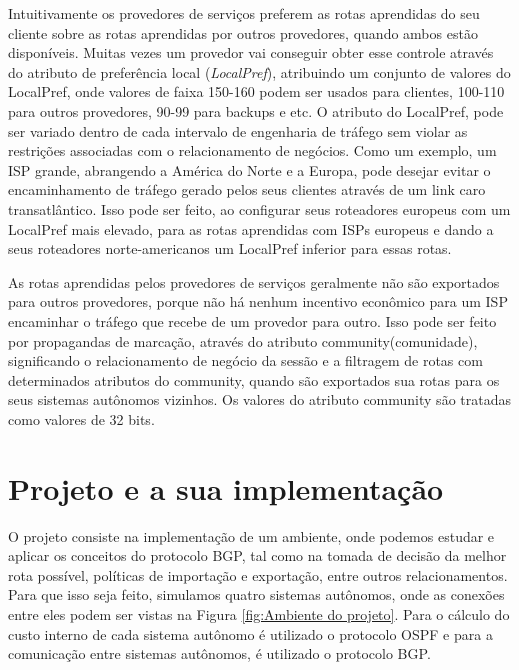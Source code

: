 \documentclass[12pt,a4paper]{report}
\begin{document}
Intuitivamente os provedores de servi\c{c}os preferem as rotas aprendidas do seu cliente sobre as rotas aprendidas por outros provedores, quando ambos est\~ao dispon\'iveis. Muitas vezes um provedor vai conseguir obter esse controle atrav\'es do atributo de prefer\^encia local (\textit{LocalPref})\cite{rfc1997}, atribuindo um conjunto de valores do LocalPref, onde valores de faixa 150-160 podem ser usados para clientes, 100-110 para outros provedores, 90-99 para backups e etc. O atributo do LocalPref, pode ser variado dentro de cada intervalo de engenharia de tr\'afego sem violar as restri\c{c}\~oes associadas com o relacionamento de neg\'ocios.\cite{rfc1997} Como um exemplo, um ISP grande, abrangendo a Am\'erica do Norte e a Europa, pode desejar evitar o encaminhamento de tr\'afego gerado pelos seus clientes atrav\'es de um link caro transatl\^antico. Isso pode ser feito, ao configurar seus roteadores europeus com um LocalPref mais elevado, para as rotas aprendidas com ISPs europeus e dando a seus roteadores norte-americanos um LocalPref inferior para essas rotas.\cite{Caesar}

As rotas aprendidas pelos provedores de servi\c{c}os geralmente n\~ao s\~ao exportados para outros provedores, porque n\~ao h\'a nenhum incentivo econ\^omico para um ISP encaminhar o tr\'afego que recebe de um provedor para outro. Isso pode ser feito por propagandas de marca\c{c}\~ao, atrav\'es do atributo community(comunidade), significando o relacionamento de neg\'ocio da sess\~ao e a filtragem de rotas com determinados atributos do community, quando s\~ao exportados sua rotas para os seus sistemas aut\^onomos vizinhos.\cite{Caesar} Os valores do atributo community s\~ao tratadas como valores de 32 bits.\cite{Caesar}

\chapter{Projeto e a sua implementa\c{c}\~ao}

O projeto consiste na implementa\c{c}\~ao de um ambiente, onde podemos estudar e aplicar os conceitos do protocolo BGP, tal como na tomada de decis\~ao da melhor rota poss\'ivel, pol\'iticas de importa\c{c}\~ao e exporta\c{c}\~ao, entre outros relacionamentos. Para que isso seja feito, simulamos quatro sistemas aut\^onomos, onde as conex\~oes entre eles podem ser vistas na Figura \ref{fig:Ambiente do projeto}. Para o c\'alculo do custo interno de cada sistema aut\^onomo \'e utilizado o protocolo OSPF e para a comunica\c{c}\~ao entre sistemas aut\^onomos, \'e utilizado o protocolo BGP.
\end{document}
